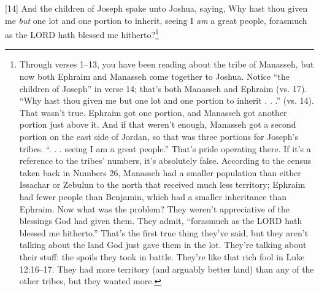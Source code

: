 [14] \textcolor[rgb]{0.00,0.00,1.00}{And the children of Joseph spake unto Joshua, saying, Why hast thou given me \emph{but} one lot and one portion to inherit, seeing I \emph{am} a great people, forasmuch as the LORD hath blessed me hitherto?}\footnote{Through verses 1–13, you have been
reading about the tribe of Manasseh, but now
both Ephraim and Manasseh come together to
Joshua. Notice “the children of Joseph” in
verse 14; that’s both Manasseh and Ephraim
(vs. 17).
“Why hast thou given me but one lot and
one portion to inherit . . .” (vs. 14). That
wasn’t true. Ephraim got one portion, and
Manasseh got another portion just above it.
And if that weren’t enough, Manasseh got a
second portion on the east side of Jordan, so
that was three portions for Joseph’s tribes.
“. . . seeing I am a great people.” That’s
pride operating there. If it’s a reference to the
tribes’ numbers, it’s absolutely false. According
to the census taken back in Numbers 26,
Manasseh had a smaller population than either
Issachar or Zebulun to the north that received
much less territory; Ephraim had fewer people
than Benjamin, which had a smaller inheritance
than Ephraim.
Now what was the problem? They weren’t
appreciative of the blessings God had given
them. They admit, “forasmuch as the LORD
hath blessed me hitherto.” That’s the first true
thing they’ve said, but they aren’t talking about
the land God just gave them in the lot. They’re
talking about their stuff: the spoils they took in
battle. They’re like that rich fool in Luke
12:16–17. They had more territory (and
arguably better land) than any of the other
tribes, but they wanted more.}
